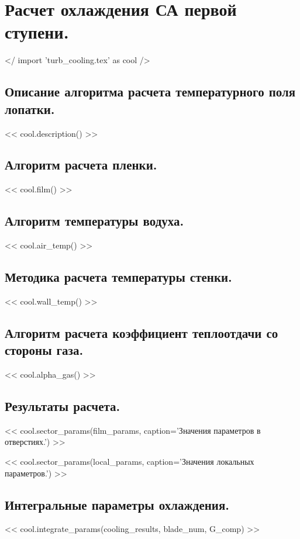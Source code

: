 \documentclass[a4paper,10pt]{article}
\begin{document}
\section{Расчет охлаждения СА первой ступени.}

    </ import 'turb_cooling.tex' as cool />

    \subsection{Описание алгоритма расчета температурного поля лопатки.}
    << cool.description() >>

    \subsection{Алгоритм расчета пленки.}

    << cool.film() >>

    \subsection{Алгоритм температуры водуха.}

    << cool.air_temp() >>

    \subsection{Методика расчета температуры стенки.}
    << cool.wall_temp() >>

    \subsection{Алгоритм расчета коэффициент теплоотдачи со стороны газа.}

    << cool.alpha_gas() >>

    \subsection{Результаты расчета.}

    << cool.sector_params(film_params, caption='Значения параметров в отверстиях.') >>

    << cool.sector_params(local_params, caption='Значения локальных параметров.') >>

    \subsection{Интегральные параметры охлаждения.}

    << cool.integrate_params(cooling_results, blade_num, G_comp) >>
\end{document}

